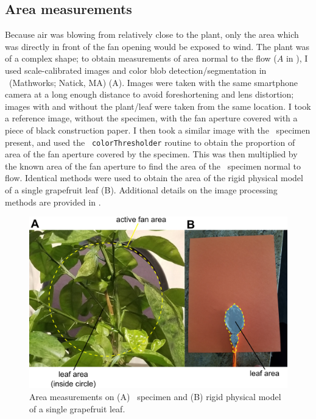 \subsection{Area measurements}
Because air was blowing from relatively close to the plant, only the area which was directly in front of the fan opening would be exposed to wind. The plant was of a complex shape; to obtain measurements of area normal to the flow ($A$ in ), I used scale-calibrated images and color blob detection/segmentation in \Matlab\ (Mathworks; Natick, MA) (A). Images were taken with the same smartphone camera at a long enough distance to avoid foreshortening and lens distortion; images with and without the plant/leaf were taken from the same location. I took a reference image, without the specimen, with the fan aperture covered with a piece of black construction paper. I then took a similar image with the \Cxparadisi\ specimen present, and used the \Matlab\ \lstinline{colorThresholder} routine to obtain the proportion of area of the fan aperture covered by the specimen. This was then multiplied by the known area of the fan aperture to find the area of the \Cxparadisi\ specimen normal to flow. Identical methods were used to obtain the area of the rigid physical model of a single grapefruit leaf (B). Additional details on the image processing methods are provided in . 
\begin{figure}
\begin{center}
\includegraphics{figures/fig2.png}
\end{center}
\caption{Area measurements on (A) \Cxparadisi\ specimen and (B) rigid physical model of a single grapefruit leaf.}
\label{fig:methods:area}
\end{figure}






